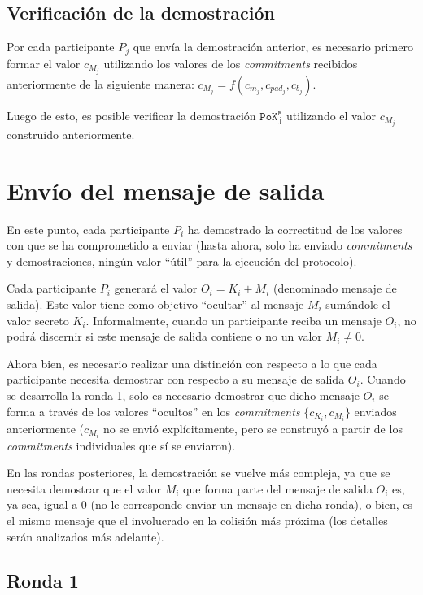 \subsection{Verificación de la demostración}

Por cada participante $P_j$ que envía la demostración anterior, es necesario 
primero formar el valor $c_{M_j}$ utilizando los valores de los 
\emph{commitments} recibidos anteriormente de la siguiente manera: 
$c_{M_j} = f(c_{m_j}, c_{pad_j}, c_{b_j})$.

Luego de esto, es posible verificar la demostración $\mathtt{PoK_j^M}$ 
utilizando el valor $c_{M_j}$ construido anteriormente.

\section{Envío del mensaje de salida}

En este punto, cada participante $P_i$ ha demostrado la correctitud de los 
valores con que se ha comprometido a enviar (hasta ahora, solo ha enviado 
\emph{commitments} y demostraciones, ningún valor ``útil'' para la ejecución 
del protocolo).

Cada participante $P_i$ generará el valor $O_i = K_i + M_i$ (denominado 
mensaje de salida). Este valor tiene como objetivo ``ocultar'' al mensaje $M_i$
sumándole el valor secreto $K_i$. Informalmente, cuando un participante reciba 
un mensaje $O_i$, no podrá discernir si este mensaje de salida contiene o no 
un valor $M_i \neq 0$.

Ahora bien, es necesario realizar una distinción con respecto a lo que cada 
participante necesita demostrar con respecto a su mensaje de salida $O_i$. 
Cuando se desarrolla la ronda 1, solo es necesario demostrar que dicho mensaje 
$O_i$ se forma a través de los valores ``ocultos'' en los \emph{commitments} 
$\{c_{K_i}, c_{M_i}\}$ enviados anteriormente ($c_{M_i}$ no se envió 
explícitamente, pero se construyó a partir de los \emph{commitments} 
individuales que sí se enviaron).

En las rondas posteriores, la demostración se vuelve más compleja, ya que se 
necesita demostrar que el valor $M_i$ que forma parte del mensaje de salida 
$O_i$ es, ya sea, igual a 0 (no le corresponde enviar un mensaje en dicha 
ronda), o bien, es el mismo mensaje que el involucrado en la colisión más 
próxima (los detalles serán analizados más adelante).

\subsection{Ronda 1}

